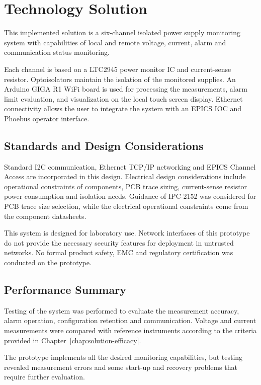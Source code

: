 
\chapter{Technology Solution}
\label{chap:tech-sol}

This implemented solution is a six-channel isolated power
supply monitoring system with capabilities of local and
remote voltage, current, alarm and communication status
monitoring.

Each channel is based on a LTC2945 power monitor IC
and current-sense resistor. Optoisolators maintain
the isolation of the monitored supplies. An Arduino GIGA R1
WiFi board is used for processing the measurements,
alarm limit evaluation, and visualization on the local
touch screen display. Ethernet connectivity allows the user to
integrate the system with an EPICS IOC and Phoebus
operator interface.

\section{Standards and Design Considerations}

Standard I2C communication, Ethernet TCP/IP networking
and EPICS Channel Access are incorporated in this design.
Electrical design considerations include operational
constraints of components, PCB trace sizing, current-sense
resistor power consumption and isolation needs. Guidance
of IPC-2152 was considered for PCB trace size selection,
while the electrical operational constraints come from the
component datasheets.

This system is designed for laboratory use. Network
interfaces of this prototype do not provide the necessary
security features for deployment in untrusted networks.
No formal product safety, EMC and regulatory
certification was conducted on the prototype.

\section{Performance Summary}

Testing of the system was performed to evaluate the
measurement accuracy, alarm operation, configuration
retention and communication. Voltage and current
measurements were compared with reference instruments
according to the criteria provided in
Chapter~\ref{chap:solution-efficacy}.

The prototype implements all the desired monitoring
capabilities, but testing revealed measurement errors
and some start-up and recovery problems that require
further evaluation.